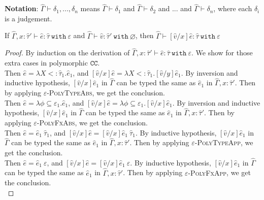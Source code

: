 \documentclass{llncs}
\newcommand{\keywadj}[1]{\mathtt{#1}}
\newcommand{\keyw}[1]{\keywadj{#1}~}
\newcommand{\kw}[1]{\keyw{ #1 }}
\newcommand{\kwa}[1]{\keywadj{ #1 }}
\begin{document}
\noindent
\textbf{Notation}: $\hat \Gamma \vdash \delta_1, ..., \delta_n$ means $\hat \Gamma \vdash \delta_1$ and $\hat \Gamma \vdash \delta_2$ and ... and $\hat \Gamma \vdash \delta_n$, where each $\delta_i$ is a judgement.

\hrulefill

\begin{lemma}
If $\hat \Gamma, x: \hat \tau' \vdash \hat e: \hat \tau~\kw{with} \varepsilon$ and $\hat \Gamma \vdash \hat v: \hat \tau'~\kw{with} \varnothing$, then $\hat \Gamma \vdash [\hat v/x]\hat e: \hat \tau~\kw{with} \varepsilon$
\end{lemma}

\begin{proof} By induction on the derivation of $\hat \Gamma, x: \hat \tau' \vdash \hat e: \hat \tau~\kw{with} \varepsilon$. We show for those extra cases in polymorphic $\kwa{CC}$.\\



 Then $\hat e = \lambda X <: \hat \tau_1. \hat e_1$, and $[\hat v/x]\hat e = \lambda X <: \hat \tau_1. [\hat v/y]\hat e_1$. By inversion and inductive hypothesis, $[\hat v/x]\hat e_1$ in $\hat \Gamma$ can be typed the same as $\hat e_1$ in $\hat \Gamma, x: \hat \tau'$. Then by applying \textsc{$\varepsilon$-PolyTypeAbs}, we get the conclusion.\\

 Then $\hat e = \lambda \phi \subseteq \varepsilon_1. \hat e_1$, and $[\hat v/x]\hat e = \lambda \phi \subseteq \varepsilon_1. [\hat v/x]\hat e_1$. By inversion and inductive hypothesis, $[\hat v/x]\hat e_1$ in $\hat \Gamma$ can be typed the same as $\hat e_1$ in $\hat \Gamma, x: \hat \tau'$. Then by applying \textsc{$\varepsilon$-PolyFxAbs}, we get the conclusion. \\


 Then $\hat e = \hat e_1~\hat \tau_1$, and $[\hat v/x]\hat e = [\hat v/x]\hat e_1~\hat \tau_1$. By inductive hypothesis, $[\hat v/x]\hat e_1$ in $\hat \Gamma$ can be typed the same as $\hat e_1$ in $\hat \Gamma, x: \hat \tau'$. Then by applying \textsc{$\varepsilon$-PolyTypeApp}, we get the conclusion.\\

 Then $\hat e = \hat e_1~\varepsilon$, and $[\hat v/x]\hat e = [\hat v/x]\hat e_1~\varepsilon$. By inductive hypothesis, $[\hat v/x]\hat e_1$ in $\hat \Gamma$ can be typed the same as $\hat e_1$ in $\hat \Gamma, x: \hat \tau'$. Then by applying \textsc{$\varepsilon$-PolyFxApp}, we get the conclusion.\\



\end{proof}
\end{document}
